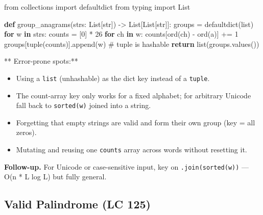 \documentclass[11pt]{article}
\providecommand{\tightlist}{\setlength{\itemsep}{1pt}\setlength{\parskip}{0pt}}
\newenvironment{Shaded}{\begin{snugshade}}{\end{snugshade}}
\newcommand{\BuiltInTok}[1]{\textcolor[rgb]{0.50,0.55,0.55}{#1}}
\newcommand{\CommentTok}[1]{\textcolor[rgb]{0.48,0.49,0.49}{#1}}
\newcommand{\ControlFlowTok}[1]{\textcolor[rgb]{0.99,0.74,0.29}{\textbf{#1}}}
\newcommand{\DecValTok}[1]{\textcolor[rgb]{0.96,0.45,0.00}{#1}}
\newcommand{\ImportTok}[1]{\textcolor[rgb]{0.15,0.68,0.38}{#1}}
\newcommand{\KeywordTok}[1]{\textcolor[rgb]{0.81,0.81,0.76}{\textbf{#1}}}
\newcommand{\NormalTok}[1]{\textcolor[rgb]{0.81,0.81,0.76}{#1}}
\newcommand{\OperatorTok}[1]{\textcolor[rgb]{0.81,0.81,0.76}{#1}}
\newcommand{\StringTok}[1]{\textcolor[rgb]{0.96,0.31,0.31}{#1}}
\begin{document}
\begin{Shaded}
\begin{Highlighting}[]
\ImportTok{from}\NormalTok{ collections }\ImportTok{import}\NormalTok{ defaultdict}
\ImportTok{from}\NormalTok{ typing }\ImportTok{import}\NormalTok{ List}

\KeywordTok{def}\NormalTok{ group\_anagrams(strs: List[}\BuiltInTok{str}\NormalTok{]) }\OperatorTok{{-}\textgreater{}}\NormalTok{ List[List[}\BuiltInTok{str}\NormalTok{]]:}
\NormalTok{    groups }\OperatorTok{=}\NormalTok{ defaultdict(}\BuiltInTok{list}\NormalTok{)}
    \ControlFlowTok{for}\NormalTok{ w }\KeywordTok{in}\NormalTok{ strs:}
\NormalTok{        counts }\OperatorTok{=}\NormalTok{ [}\DecValTok{0}\NormalTok{] }\OperatorTok{*} \DecValTok{26}
        \ControlFlowTok{for}\NormalTok{ ch }\KeywordTok{in}\NormalTok{ w:}
\NormalTok{            counts[}\BuiltInTok{ord}\NormalTok{(ch) }\OperatorTok{{-}} \BuiltInTok{ord}\NormalTok{(}\StringTok{\textquotesingle{}a\textquotesingle{}}\NormalTok{)] }\OperatorTok{+=} \DecValTok{1}
\NormalTok{        groups[}\BuiltInTok{tuple}\NormalTok{(counts)].append(w)   }\CommentTok{\# tuple is hashable}
    \ControlFlowTok{return} \BuiltInTok{list}\NormalTok{(groups.values())}
\end{Highlighting}
\end{Shaded}

** Error-prone spots:**

\begin{itemize}
\tightlist
\item
  Using a \texttt{list} (unhashable) as the dict key instead of a \texttt{tuple}.
\item
  The count-array key only works for a fixed alphabet; for arbitrary Unicode fall back to \texttt{sorted(w)} joined into a string.
\item
  Forgetting that empty strings are valid and form their own group (key = all zeros).
\item
  Mutating and reusing one \texttt{counts} array across words without resetting it.
\end{itemize}

\textbf{Follow-up.} For Unicode or case-sensitive input, key on \texttt{\textquotesingle{}\textquotesingle{}.join(sorted(w))} --- O(n * L log L) but fully general.

\subsection{Valid Palindrome (LC 125)}\label{valid-palindrome-lc-125}
\end{document}
